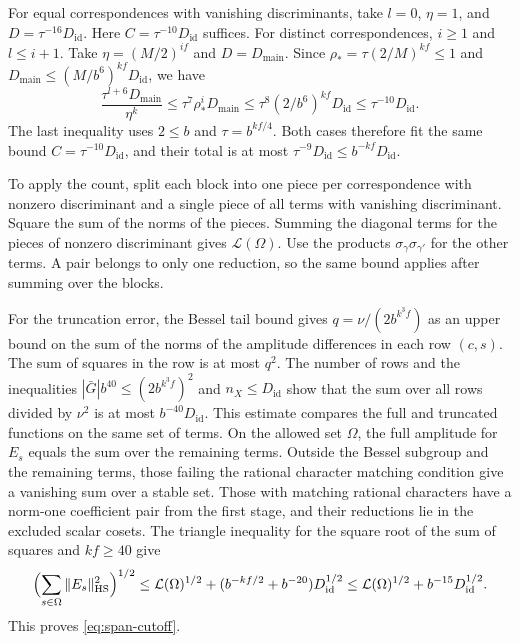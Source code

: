 For equal correspondences with vanishing discriminants, take
\(l=0\), \(\eta=1\), and \(D=\tau^{-16}D_{\mathrm{id}}\).
Here \(C=\tau^{-10}D_{\mathrm{id}}\) suffices. For distinct correspondences,
\(i\ge1\) and \(l\le i+1\). Take \(\eta=(M/2)^{if}\) and
\(D=D_{\mathrm{main}}\). Since \(\rho_\ast=\tau(2/M)^{kf}\le1\) and
\(D_{\mathrm{main}}\le(M/b^6)^{kf}D_{\mathrm{id}}\), we have
\[
 \frac{\tau^{l+6}D_{\mathrm{main}}}{\eta^k}
 \le \tau^7\rho_\ast^iD_{\mathrm{main}}
 \le \tau^8(2/b^6)^{kf}D_{\mathrm{id}}
 \le \tau^{-10}D_{\mathrm{id}} .
\]
The last inequality uses \(2\le b\) and \(\tau=b^{kf/4}\).
Both cases therefore fit the same bound \(C=\tau^{-10}D_{\mathrm{id}}\),
and their total is at most \(\tau^{-9}D_{\mathrm{id}}\le b^{-kf}D_{\mathrm{id}}\).

To apply the count, split each block into one piece per correspondence
with nonzero discriminant and a single piece of all terms with vanishing
discriminant. Square the sum of the norms of the pieces. Summing the
diagonal terms for the pieces of nonzero discriminant gives
\(\mathcal L(\Omega)\). Use the products
\(\sigma_\gamma\sigma_{\gamma'}\) for the other terms. A pair belongs to
only one reduction, so the same bound applies after summing over the blocks.

For the truncation error, the Bessel tail bound gives
\(q=\nu/(2b^{k^3 f})\) as an upper bound on the sum of the norms of the
amplitude differences in each row \((c,s)\). The sum of squares in the
row is at most \(q^2\). The number of rows and the inequalities
\(|\bar G|b^{40}\le(2b^{k^3 f})^2\) and \(n_X\le D_{\mathrm{id}}\) show that
the sum over all rows divided by \(\nu^2\) is at most
\(b^{-40}D_{\mathrm{id}}\). This estimate compares the full and truncated
functions on the same set of terms.
On the allowed set \(\Omega\), the full amplitude for \(E_s\) equals the
sum over the remaining terms. Outside the Bessel subgroup and the
remaining terms, those failing the rational character matching condition
give a vanishing sum over a stable set. Those with matching rational
characters have a norm-one coefficient pair from the first stage, and
their reductions lie in the excluded scalar cosets.
The triangle inequality for the square root of the sum of squares and
\(kf\ge40\) give
\[
 \Bigl(\sum_{s\in\Omega}\|E_s\|_{\mathrm{HS}}^2\Bigr)^{1/2}
 \le \mathcal L(\Omega)^{1/2}
       +(b^{-kf/2}+b^{-20})D_{\mathrm{id}}^{1/2}
 \le \mathcal L(\Omega)^{1/2}+b^{-15}D_{\mathrm{id}}^{1/2}.
\]
This proves \eqref{eq:span-cutoff}.

